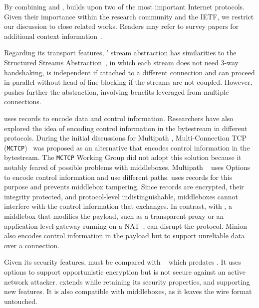 
By combining \tcp and \tls, \tcpls builds upon two of the most important
Internet protocols. Given their importance within  the research community and the IETF, we restrict our discussion to close related works. Readers may refer to survey papers for additional  context
information~\cite{polese2019survey,li2016multipath,papastergiou2016ossifying}.

Regarding its transport features, \tcpls' stream abstraction has similarities to
the Structured Streams Abstraction~\cite{ford2007structured}, in which each
stream does not need 3-way handshaking, is independent if attached to a
different \tcp connection and can proceed in parallel without head-of-line
blocking if the streams are not coupled. However, \tcpls pushes further the
abstraction, involving benefits leveraged from multiple connections.

\tcpls uses \tls records to encode data and control information. Researchers
have also explored the idea of encoding control information in the \tcp
bytestream in different protocols. During the initial discussions for Multipath \tcp, Multi-Connection TCP (\texttt{MCTCP})~\cite{draft-scharf-mptcp-mctcp-01}
was proposed as an alternative that encodes control information in the bytestream. The \texttt{MCTCP} Working Group did not adopt this solution because it notably feared of possible problems with middleboxes. Multipath \tcp~\cite{raiciu2012hard,rfc8684} uses \tcp Options to encode control information and use different paths. \tcpls uses \tls records for this purpose and prevents middlebox tampering. Since \tls records are encrypted, their integrity protected, and protocol-level indistinguishable, middleboxes cannot interfere with the control information that \tcpls exchanges. In contrast, with \mptcp, a middlebox that modifies the payload, such as a transparent \tcp proxy or an application level gateway running on a NAT~\cite{rfc3027}, can disrupt the
protocol. Minion~\cite{nowlan2012fitting} also encodes control information in
the \tcp payload but to support unreliable data over a connection.

Given its security features, \tcpls must be compared with
\tcpcrypt~\cite{bittau2010case,rfc8548} which predates . It uses \tcp
options to support opportunistic encryption but is not secure against an active
network attacker. \tcpls extends \tls while retaining its security  properties, and supporting new features. It is also compatible with \tcp  middleboxes, as it leaves the \tcp wire format untouched.

